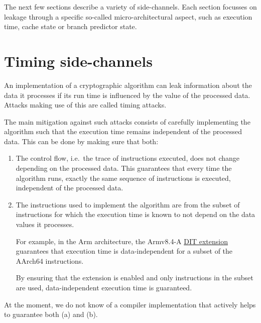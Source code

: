 \documentclass[
  a4paper,
]{report}
\begin{document}
The next few sections describe a variety of side-channels. Each section
focusses on leakage through a specific so-called
\label{__index_entry_104}{micro-architectural}
aspect, such as execution time, cache state or branch predictor state.

\section{Timing side-channels}\label{timing-side-channels}

An implementation of a cryptographic algorithm can leak information
about the data it processes if its run time is influenced by the value
of the processed data. Attacks making use of this are called
\label{__index_entry_105}{timing
attacks}.

The main mitigation against such attacks consists of carefully
implementing the algorithm such that the execution time remains
independent of the processed data. This can be done by making sure that
both:

\begin{enumerate}
\def\labelenumi{\alph{enumi})}
\item
  The control flow, i.e.~the trace of instructions executed, does not
  change depending on the processed data. This guarantees that every
  time the algorithm runs, exactly the same sequence of instructions is
  executed, independent of the processed data.
\item
  The instructions used to implement the algorithm are from the subset
  of instructions for which the execution time is known to not depend on
  the data values it processes.

  For example, in the Arm architecture, the Armv8.4-A
  \href{https://developer.arm.com/documentation/ddi0595/2021-06/AArch64-Registers/DIT--Data-Independent-Timing}{DIT
  extension} guarantees that execution time is data-independent for a
  subset of the AArch64 instructions.

  By ensuring that the extension is enabled and only instructions in the
  subset are used, data-independent execution time is guaranteed.
\end{enumerate}

At the moment, we do not know of a compiler implementation that actively
helps to guarantee both (a) and (b).
\end{document}
